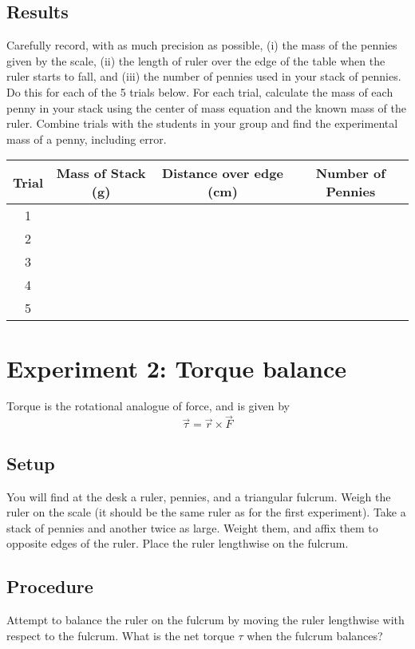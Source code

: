 \documentclass[12pt]{article}
\begin{document}
\subsection{Results}
Carefully record, with as much precision as possible, (i) the mass of the pennies given by the scale, (ii) the length of ruler over the edge of the table when the ruler starts to fall, and (iii) the number of pennies used in your stack of pennies. Do this for each of the 5 trials below.
For each trial, calculate the mass of each penny in your stack using the center of mass equation and the known mass of the ruler. Combine trials with the students in your group and find the experimental mass of a penny, including error. 
\begin{table}[H]
\centering
 \begin{tabular}{|c|| c |c |c |} 
 \hline
 Trial & Mass of Stack (g) & Distance over edge (cm) & Number of Pennies \\ [0.5ex] 
 \hline\hline
 1 & \, & \, & \, \\ 
 \hline
 2 & \, & \, & \, \\
 \hline
 3 & \, & \, & \, \\
 \hline
 4 & \, & \, & \, \\
 \hline
 5 & \, & \, & \, \\ [1ex] 
 \hline
 \end{tabular}
\end{table}


\section{Experiment 2: Torque balance}
Torque is the rotational analogue of force, and is given by 
\begin{equation}
\label{eq: torque}
\vec{\tau} = \vec{r} \times \vec{F}
\end{equation}

\subsection{Setup}
You will find at the desk a ruler, pennies, and a triangular fulcrum. Weigh the ruler on the scale (it should be the same ruler as for the first experiment).
Take a stack of pennies and another twice as large. Weight them, and affix them to opposite edges of the ruler. Place the ruler lengthwise on the fulcrum.

\subsection{Procedure}
Attempt to balance the ruler on the fulcrum by moving the ruler lengthwise with respect to the fulcrum. What is the net torque $\tau$ when the fulcrum balances?
\end{document}
